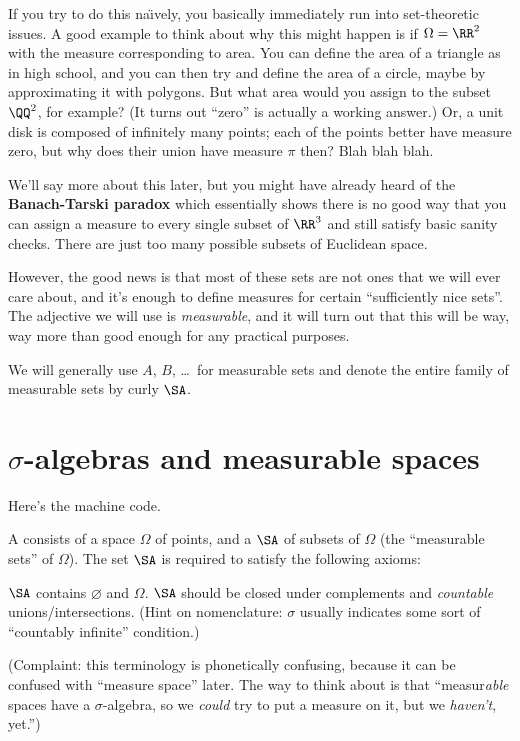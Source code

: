 If you try to do this na\"{\i}vely,
you basically immediately run into set-theoretic issues.
A good example to think about why this might happen
is if $\Omega = \RR^2$ with the measure corresponding to area.
You can define the area of a triangle as in high school,
and you can then try and define the area of a circle,
maybe by approximating it with polygons.
But what area would you assign to the subset $\QQ^2$, for example?
(It turns out ``zero'' is actually a working answer.)
Or, a unit disk is composed of infinitely many points;
each of the points better have measure zero,
but why does their union have measure $\pi$ then?
Blah blah blah.

We'll say more about this later, but
you might have already heard of the \textbf{Banach-Tarski paradox}
which essentially shows there is no good way that you can assign a
measure to every single subset of $\RR^3$
and still satisfy basic sanity checks.
There are just too many possible subsets of Euclidean space.

However, the good news is that most of these sets are not ones
that we will ever care about,
and it's enough to define measures for certain
``sufficiently nice sets''.
The adjective we will use is \emph{measurable},
and it will turn out that this will be way, way more than good enough
for any practical purposes.

We will generally use $A$, $B$, \dots\ for measurable sets
and denote the entire family of measurable sets by curly $\SA$.

\section{$\sigma$-algebras and measurable spaces}
Here's the machine code.
\begin{definition}
	A  consists of a space $\Omega$ of points,
	and a  $\SA$ of subsets of $\Omega$
	(the ``measurable sets'' of $\Omega$).
	The set $\SA$ is required to satisfy the following axioms:
	\begin{itemize}
		\ii $\SA$ contains $\varnothing$ and $\Omega$.
		\ii $\SA$ should be closed under complements and
		\emph{countable} unions/intersections.
		(Hint on nomenclature: $\sigma$ usually indicates
		some sort of ``countably infinite'' condition.)
	\end{itemize}
\end{definition}
(Complaint: this terminology is phonetically confusing,
because it can be confused with ``measure space'' later.
The way to think about is that
``measur\emph{able} spaces have a $\sigma$-algebra, so we \emph{could}
try to put a measure on it, but we \emph{haven't}, yet.'')

